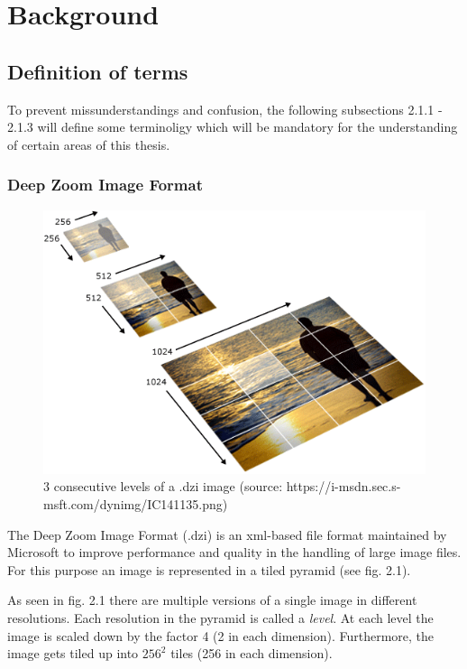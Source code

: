 \chapter{Background}

\section{Definition of terms}

To prevent missunderstandings and confusion, the following subsections 2.1.1 - 2.1.3 will define some terminoligy which will be mandatory for the understanding of certain areas of this thesis.


\subsection{Deep Zoom Image Format}

\begin{figure}[H]
	\begin{center}
		\includegraphics[scale=0.5]{img/dzi_pyramid.png}
		\caption{3 consecutive levels of a .dzi image (source: https://i-msdn.sec.s-msft.com/dynimg/IC141135.png)}
		\label{fig:fig2.1}
	\end{center}
\end{figure}

The Deep Zoom Image Format (.dzi) is an xml-based file format maintained by Microsoft to improve performance and quality in the handling of large image files. For this purpose an image is represented in a tiled pyramid (see fig. 2.1).

As seen in fig. 2.1 there are multiple versions of a single image in different resolutions. Each resolution in the pyramid is called a \emph{level}. At each level the image is scaled down by the factor 4 (2 in each dimension). Furthermore, the image gets tiled up into $256^2$ tiles (256 in each dimension)\cite{web:dzi}.

